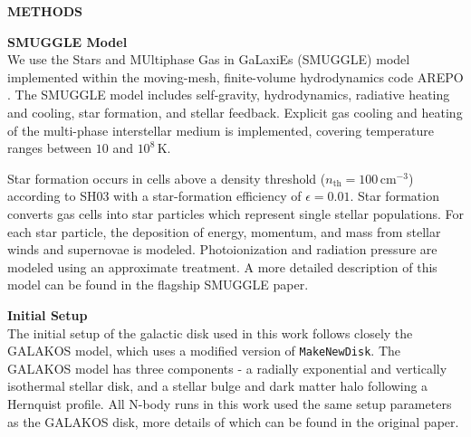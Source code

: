 \documentclass{natureprintstyle}
\begin{document}

\newpage

\setcounter{page}{1}
\setcounter{figure}{0}
\setcounter{table}{0}
\captionsetup[figure]{labelformat=empty}
\renewcommand{\figurename}{Extended Data Figure}
\renewcommand{\thetable}{Extended Data \arabic{table}}

\begin{center}
{\bf \Large \uppercase{Methods} }
\end{center}

\noindent
{\bf SMUGGLE Model}
\\
\noindent
We use the Stars and MUltiphase Gas in GaLaxiEs (SMUGGLE) model
\cite{2019MNRAS.489.4233M} implemented within the moving-mesh, finite-volume
hydrodynamics code AREPO \cite{2010MNRAS.401..791S}. The SMUGGLE model
includes self-gravity, hydrodynamics, radiative heating and cooling, star
formation, and stellar feedback. Explicit gas cooling and heating of the
multi-phase interstellar medium is implemented, covering temperature ranges
between $10$ and $10^8\,\textrm{K}$.

Star formation occurs in cells above a density threshold
($n_{\textrm{th}}=100\,\textrm{cm}^{-3}$) according to SH03 with a
star-formation efficiency of $\epsilon = 0.01$. Star formation converts gas
cells into star particles which represent single stellar populations. For each
star particle, the deposition of energy, momentum, and mass from stellar winds
and supernovae is modeled. Photoionization and radiation pressure are modeled
using an approximate treatment. A more detailed description of this model can
be found in the flagship SMUGGLE paper.\cite{2019MNRAS.489.4233M}

\vspace{12pt}

\noindent
{\bf Initial Setup}
\\
\noindent
The initial setup of the galactic disk used in this work follows closely the
GALAKOS model\cite{2020ApJ...890..117D}, which uses a modified version of
\texttt{MakeNewDisk}.\cite{2005MNRAS.361..776S} The GALAKOS model has three
components - a radially exponential and vertically isothermal stellar disk,
and a stellar bulge and dark matter halo following a Hernquist
profile.\cite{1990ApJ...356..359H} All N-body runs in this work used the same
setup parameters as the GALAKOS disk, more details of which can be found in
the original paper.
\end{document}
